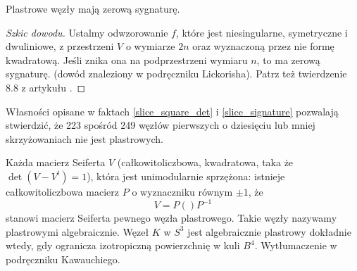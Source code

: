 
\begin{proposition} \label{slice_signature}
    Plastrowe węzły mają zerową sygnaturę.
\end{proposition}

\begin{proof}[Szkic dowodu]
    Ustalmy odwzorowanie $f$, które jest niesingularne, symetryczne i dwuliniowe, z przestrzeni $V$ o wymiarze $2n$ oraz wyznaczoną przez nie formę kwadratową.
    Jeśli znika ona na podprzestrzeni wymiaru $n$, to ma zerową sygnaturę.
    (dowód znaleziony w podręczniku Lickorisha).
    Patrz też twierdzenie 8.8 z artykułu \cite{murasugi65}.
\end{proof}

Własności opisane w faktach \ref{slice_square_det} i \ref{slice_signature} pozwalają stwierdzić, że 223 spośród 249 węzłów pierwszych o dziesięciu lub mniej skrzyżowaniach nie jest plastrowych.

Każda macierz Seiferta $V$ (całkowitoliczbowa, kwadratowa, taka że $\det (V - V^t) = 1$), która jest unimodularnie sprzężona: istnieje całkowitoliczbowa macierz $P$ o wyznaczniku równym $\pm 1$, że
\[
    V = P () P^{-1}
\]
stanowi macierz Seiferta pewnego węzła plastrowego.
Takie węzły nazywamy plastrowymi algebraicznie.
Węzeł $K$ w $S^3$ jest algebraicznie plastrowy dokładnie wtedy, gdy ogranicza izotropiczną powierzchnię w kuli $B^4$.
Wytłumaczenie w podręczniku Kawauchiego.

